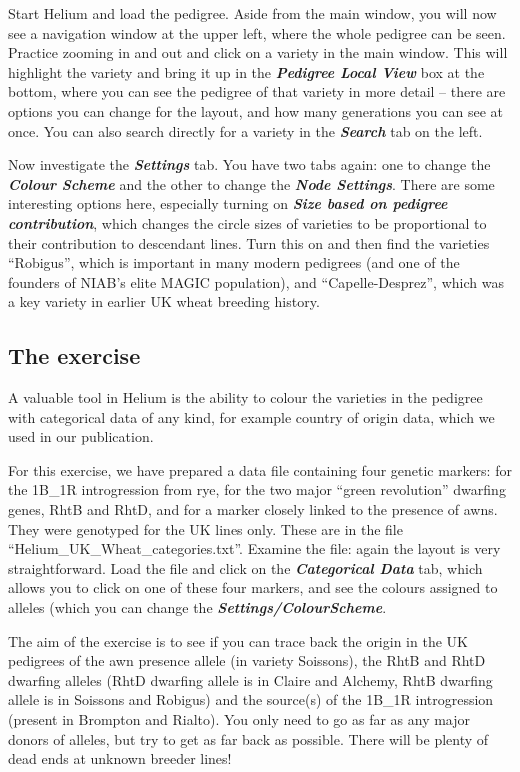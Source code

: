 \documentclass[
]{book}
\begin{document}
Start Helium and load the pedigree. Aside from the main window, you will now see a navigation window at the upper left, where the whole pedigree can be seen. Practice zooming in and out and click on a variety in the main window. This will highlight the variety and bring it up in the \textbf{\emph{Pedigree Local View}} box at the bottom, where you can see the pedigree of that variety in more detail -- there are options you can change for the layout, and how many generations you can see at once. You can also search directly for a variety in the \textbf{\emph{Search}} tab on the left.

Now investigate the \textbf{\emph{Settings}} tab. You have two tabs again: one to change the \textbf{\emph{Colour Scheme}} and the other to change the \textbf{\emph{Node Settings}}. There are some interesting options here, especially turning on \textbf{\emph{Size based on pedigree contribution}}, which changes the circle sizes of varieties to be proportional to their contribution to descendant lines. Turn this on and then find the varieties ``Robigus'', which is important in many modern pedigrees (and one of the founders of NIAB's elite MAGIC population), and ``Capelle-Desprez'', which was a key variety in earlier UK wheat breeding history.

\hypertarget{the-exercise-4}{%
\subsection{The exercise}\label{the-exercise-4}}

A valuable tool in Helium is the ability to colour the varieties in the pedigree with categorical data of any kind, for example country of origin data, which we used in our publication.

For this exercise, we have prepared a data file containing four genetic markers: for the 1B\_1R introgression from rye, for the two major ``green revolution'' dwarfing genes, RhtB and RhtD, and for a marker closely linked to the presence of awns. They were genotyped for the UK lines only. These are in the file ``Helium\_UK\_Wheat\_categories.txt''. Examine the file: again the layout is very straightforward. Load the file and click on the \textbf{\emph{Categorical Data}} tab, which allows you to click on one of these four markers, and see the colours assigned to alleles (which you can change the \textbf{\emph{Settings/ColourScheme}}.

The aim of the exercise is to see if you can trace back the origin in the UK pedigrees of the awn presence allele (in variety Soissons), the RhtB and RhtD dwarfing alleles (RhtD dwarfing allele is in Claire and Alchemy, RhtB dwarfing allele is in Soissons and Robigus) and the source(s) of the 1B\_1R introgression (present in Brompton and Rialto). You only need to go as far as any major donors of alleles, but try to get as far back as possible. There will be plenty of dead ends at unknown breeder lines!
\end{document}
